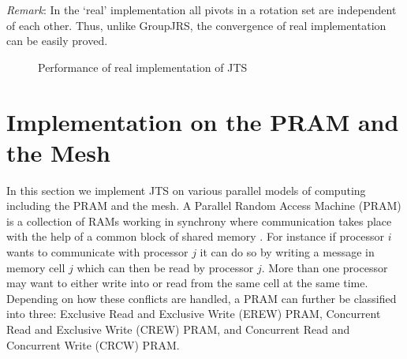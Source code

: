 \documentclass[10pt, conference, compsocconf]{IEEEtran}
\begin{document}
\noindent\emph{Remark}: In the `real' implementation all pivots in a rotation set are independent of each other. Thus, unlike GroupJRS, the convergence of real implementation can be easily proved.


\begin{figure}[!htb]
\centering
{} \hfill
{} \hfill
{}
\caption{Performance of real implementation of JTS}
\label{fig:real}
\end{figure}

\section{Implementation on the PRAM and the Mesh}
\label{sec:other}

 In this section we implement JTS on various parallel models of computing including the PRAM and the mesh. A Parallel Random Access Machine (PRAM) is a collection of RAMs working in synchrony where communication takes place with the help of a common block of shared memory \cite{jaja1992introduction,horowitz2008computer}.  For instance if processor $i$ wants to communicate with processor $j$ it can do so by writing a message in memory cell $j$ which can then be read by processor $j$. More than one processor may want to either write into or read from the same cell at the same time. Depending on how these conflicts are handled, a PRAM can further be classified into three: Exclusive Read and Exclusive Write (EREW) PRAM, Concurrent Read and Exclusive Write (CREW) PRAM, and Concurrent Read and Concurrent Write (CRCW) PRAM.
\end{document}
